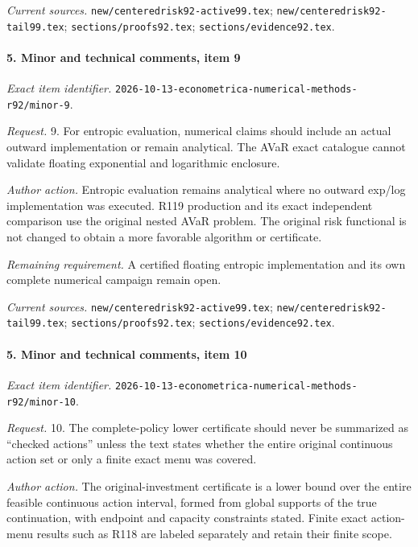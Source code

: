 \par\emph{Current sources.} \nolinkurl{new/centeredrisk92-active99.tex}; \nolinkurl{new/centeredrisk92-tail99.tex}; \nolinkurl{sections/proofs92.tex}; \nolinkurl{sections/evidence92.tex}.

\paragraph{5. Minor and technical comments, item 9}

\emph{Exact item identifier.} \nolinkurl{2026-10-13-econometrica-numerical-methods-r92/minor-9}.

\par\emph{Request.} 9. For entropic evaluation, numerical claims should include an actual outward implementation or remain analytical. The AVaR exact catalogue cannot validate floating exponential and logarithmic enclosure.

\par\emph{Author action.} Entropic evaluation remains analytical where no outward exp/\allowbreak{}log implementation was executed. R119 production and its exact independent comparison use the original nested AVaR problem. The original risk functional is not changed to obtain a more favorable algorithm or certificate.

\par\emph{Remaining requirement.} A certified floating entropic implementation and its own complete numerical campaign remain open.

\par\emph{Current sources.} \nolinkurl{new/centeredrisk92-active99.tex}; \nolinkurl{new/centeredrisk92-tail99.tex}; \nolinkurl{sections/proofs92.tex}; \nolinkurl{sections/evidence92.tex}.

\paragraph{5. Minor and technical comments, item 10}

\emph{Exact item identifier.} \nolinkurl{2026-10-13-econometrica-numerical-methods-r92/minor-10}.

\par\emph{Request.} 10. The complete-policy lower certificate should never be summarized as “checked actions” unless the text states whether the entire original continuous action set or only a finite exact menu was covered.

\par\emph{Author action.} The original-investment certificate is a lower bound over the entire feasible continuous action interval, formed from global supports of the true continuation, with endpoint and capacity constraints stated. Finite exact action-menu results such as R118 are labeled separately and retain their finite scope.

